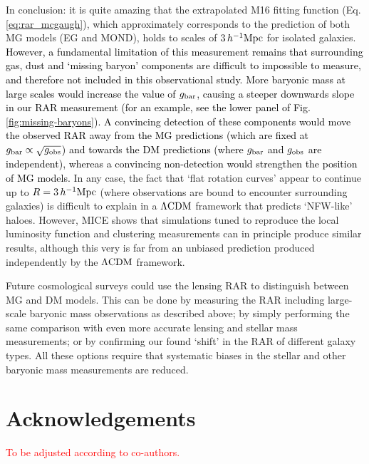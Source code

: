 \documentclass[usenatbib]{mnras}
\newcommand{\hMpc}{\, h^{-1}{\rm{Mpc}} }
\newcommand{\lcdm}{{\rm \Lambda CDM}}
\newcommand{\un}[1]{_{\rm #1}}
\begin{document}
In conclusion: it is quite amazing that the extrapolated M16 fitting function (Eq. \ref{eq:rar_mcgaugh}), which approximately corresponds to the prediction of both MG models (EG and MOND), holds to scales of $3 \hMpc$ for isolated galaxies. \textcolor{black}{However, a fundamental limitation of this measurement remains that surrounding gas, dust and `missing baryon' components are difficult to impossible to measure, and therefore not included in this observational study. More baryonic mass at large scales would increase the value of $g\un{bar}$, causing a steeper downwards slope in our RAR measurement (for an example, see the lower panel of Fig. \ref{fig:missing-baryons}). A convincing detection of these components would move the observed RAR away from the MG predictions (which are fixed at $g\un{bar} \propto \sqrt{g\un{obs}}$) and towards the DM predictions (where $g\un{bar}$ and $g\un{obs}$ are independent), whereas a convincing non-detection would strengthen the position of MG models.} In any case, the fact that `flat rotation curves' appear to continue up to $R=3\hMpc$ (where observations are bound to encounter surrounding galaxies) is difficult to explain in a $\lcdm$ framework that predicts `NFW-like' haloes. However, MICE shows that simulations tuned to reproduce the local luminosity function and clustering measurements can in principle produce similar results, although this very is far from an unbiased prediction produced independently by the $\lcdm$ framework.

Future cosmological surveys could use the lensing RAR to distinguish between MG and DM models. This can be done by measuring the RAR including large-scale baryonic mass observations as described above; by simply performing the same comparison with even more accurate lensing and stellar mass measurements; or by confirming our found `shift' in the RAR of different galaxy types. All these options require that systematic biases in the stellar and other baryonic mass measurements are reduced.




\section*{Acknowledgements}
\textcolor{red}{To be adjusted according to co-authors.}
\end{document}
